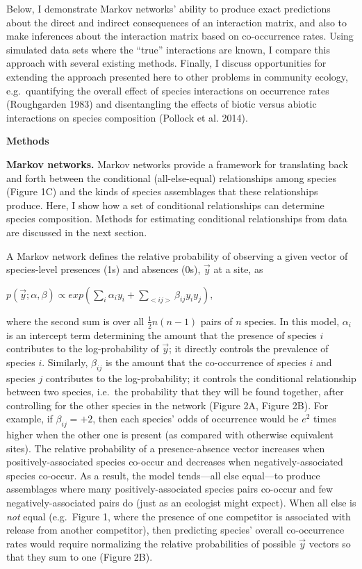 \documentclass[12pt,]{article}
\begin{document}
\begin{spacing}{1.9}
\begin{flushleft}
Below, I demonstrate Markov networks' ability to produce exact
predictions about the direct and indirect consequences of an interaction
matrix, and also to make inferences about the interaction matrix based
on co-occurrence rates. Using simulated data sets where the ``true''
interactions are known, I compare this approach with several existing
methods. Finally, I discuss opportunities for extending the approach
presented here to other problems in community ecology, e.g.~quantifying
the overall effect of species interactions on occurrence rates
(Roughgarden 1983) and disentangling the effects of biotic versus
abiotic interactions on species composition (Pollock et al. 2014).

\noindent\textbf{Methods}

\noindent
\textbf{Markov networks.} Markov networks provide a framework for
translating back and forth between the conditional (all-else-equal)
relationships among species (Figure 1C) and the kinds of species
assemblages that these relationships produce. Here, I show how a set of
conditional relationships can determine species composition. Methods for
estimating conditional relationships from data are discussed in the next
section.

A Markov network defines the relative probability of observing a given
vector of species-level presences (1s) and absences (0s), \(\vec{y}\) at
a site, as

\centering

\(\displaystyle{p(\vec{y}; \alpha, \beta) \propto exp(\sum_{i}\alpha_i y_i + \sum_{<ij>}\beta_{ij}y_i y_j),}\)

\raggedright
\setlength{\parindent}{2em}

\noindent where the second sum is over all \(\frac{1}{2}n(n-1)\) pairs
of \(n\) species. In this model, \(\alpha_{i}\) is an intercept term
determining the amount that the presence of species \(i\) contributes to
the log-probability of \(\vec{y}\); it directly controls the prevalence
of species \(i\). Similarly, \(\beta_{ij}\) is the amount that the
co-occurrence of species \(i\) and species \(j\) contributes to the
log-probability; it controls the conditional relationship between two
species, i.e.~the probability that they will be found together, after
controlling for the other species in the network (Figure 2A, Figure 2B).
For example, if \(\beta_{ij} = +2\), then each species' odds of
occurrence would be \(e^2\) times higher when the other one is present
(as compared with otherwise equivalent sites). The relative probability
of a presence-absence vector increases when positively-associated
species co-occur and decreases when negatively-associated species
co-occur. As a result, the model tends---all else equal---to produce
assemblages where many positively-associated species pairs co-occur and
few negatively-associated pairs do (just as an ecologist might expect).
When all else is \emph{not} equal (e.g.~Figure 1, where the presence of
one competitor is associated with release from another competitor), then
predicting species' overall co-occurrence rates would require
normalizing the relative probabilities of possible \(\vec{y}\) vectors
so that they sum to one (Figure 2B).


\end{flushleft}
\end{spacing}
\end{document}
